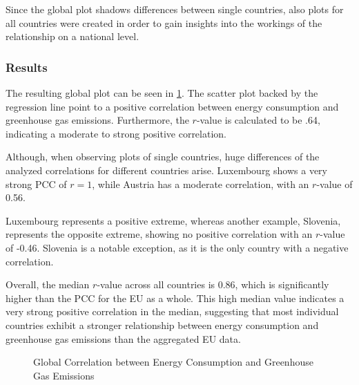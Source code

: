 \documentclass{article}
\begin{document}
Since the global plot shadows differences between single countries, also plots for all countries were created in order to gain
insights into the workings of the relationship on a national level.

\subsubsection*{Results}
The resulting global plot can be seen in \cref{plt:global_consumption_vs_emissions}.
The scatter plot backed by the regression line point to a positive correlation between energy consumption and greenhouse gas emissions.
Furthermore, the $r$-value is calculated to be .64, indicating a moderate to strong positive correlation.

Although, when observing plots of single countries, huge differences of the analyzed correlations for different countries arise.
Luxembourg shows a very strong PCC of $r=1$, while Austria has a moderate correlation, with an $r$-value of 0.56.

Luxembourg represents a positive extreme, whereas another example, Slovenia, represents the opposite extreme,
showing no positive correlation with an $r$-value of -0.46. Slovenia is a notable exception,
as it is the only country with a negative correlation.

Overall, the median $r$-value across all countries is 0.86, which is significantly higher than the PCC for the EU as a whole.
This high median value indicates a very strong positive correlation in the median, suggesting that most individual countries exhibit a stronger
relationship between energy consumption and greenhouse gas emissions than the aggregated EU data.

\begin{figure}
    \centering
    \resizebox{.7\textwidth}{!}{}
    \caption{Global Correlation between Energy Consumption and Greenhouse Gas Emissions}
    \label{plt:global_consumption_vs_emissions}
\end{figure}

\end{document}
